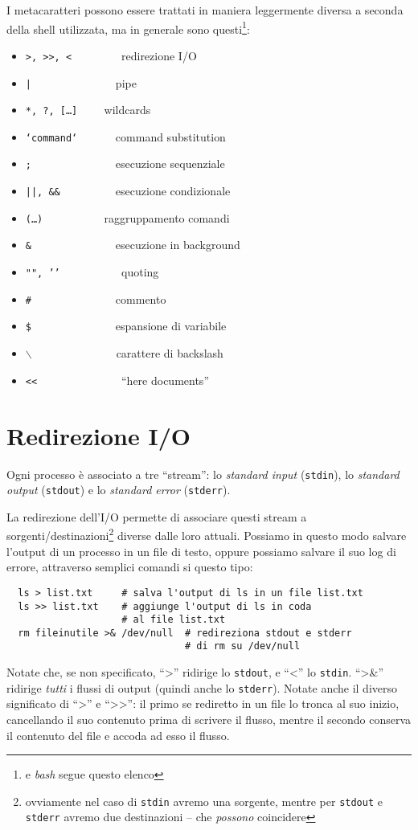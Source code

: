 I metacaratteri possono essere trattati in maniera leggermente diversa a
seconda della shell utilizzata, ma in generale sono questi\footnote{e
\textit{bash} segue questo elenco}:
\begin{itemize}
	\item \texttt{>, >>, <\ \ \ \ \ \ \ \ } redirezione I/O
	\item \texttt{|\ \ \ \ \ \ \ \ \ \ \ \ \ \ } pipe
	\item \texttt{*, ?, [\ldots]\ \ \ \ } wildcards
	\item \texttt{`command`\ \ \ \ \ \ } command substitution
	\item \texttt{;\ \ \ \ \ \ \ \ \ \ \ \ \ \ } esecuzione sequenziale
	\item \texttt{||, \&\&\ \ \ \ \ \ \ \ \ } esecuzione condizionale
	\item \texttt{(\ldots)\ \ \ \ \ \ \ \ \ \ } raggruppamento comandi
	\item \texttt{\&\ \ \ \ \ \ \ \ \ \ \ \ \ \ } esecuzione in background
	\item \texttt{"", '{}'\ \ \ \ \ \ \ \ \ \ } quoting
	\item \texttt{\#\ \ \ \ \ \ \ \ \ \ \ \ \ \ } commento
	\item \texttt{\$\ \ \ \ \ \ \ \ \ \ \ \ \ \ } espansione di variabile
	\item \texttt{$\backslash$\ \ \ \ \ \ \ \ \ \ \ \ \ \ } carattere di backslash
	\item \texttt{<<\ \ \ \ \ \ \ \ \ \ \ \ \ \ } ``here documents''
\end{itemize}

\section{Redirezione I/O}
Ogni processo \`e associato a tre ``stream'': lo \textit{standard input}
(\texttt{stdin}), lo \textit{standard output} (\texttt{stdout}) e lo
\textit{standard error} (\texttt{stderr}).

La redirezione dell'I/O permette di associare questi stream a
sorgenti/destinazioni\footnote{ovviamente nel caso di \texttt{stdin} avremo
una sorgente, mentre per \texttt{stdout} e \texttt{stderr} avremo due
destinazioni -- che \emph{possono} coincidere} diverse dalle loro attuali.
Possiamo in questo modo salvare l'output di un processo in un file di testo,
oppure possiamo salvare il suo log di errore, attraverso semplici comandi si
questo tipo:
\begin{verbatim}
  ls > list.txt     # salva l'output di ls in un file list.txt
  ls >> list.txt    # aggiunge l'output di ls in coda
                    # al file list.txt
  rm fileinutile >& /dev/null  # redireziona stdout e stderr
                               # di rm su /dev/null
\end{verbatim}
Notate che, se non specificato, ``>'' ridirige lo \texttt{stdout}, e ``<'' lo
\texttt{stdin}. ``>\&'' ridirige \emph{tutti} i flussi di output (quindi anche
lo \texttt{stderr}). Notate anche il diverso significato di ``>'' e ``>>'': il
primo se rediretto in un file lo tronca al suo inizio, cancellando il suo
contenuto prima di scrivere il flusso, mentre il secondo conserva il contenuto
del file e accoda ad esso il flusso.

